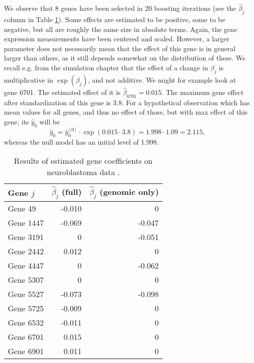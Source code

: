 We observe that 8 genes have been selected in 20 boosting iterations (see the $\hat{\beta}_j$ column in Table \ref{tab:oberthuer-beta}).
Some effects are estimated to be positive, some to be negative, but all are roughly the same size in absolute terms.
Again, the gene expression measurements have been centered and scaled.
However, a larger parameter does not necessarily mean that the effect of this gene is in general larger than others, as it still depends somewhat on the distribution of these.
We recall e.g. from the simulation chapter that the effect of a change in $\beta_j$ is multiplicative in $\exp(\beta_j)$, and not additive.
We might for example look at gene 6701.
The estimated effect of it is $\hat{\beta}_{6701}=0.015$.
The maximum gene effect after standardization of this gene is 3.8.
For a hypothetical observation which has mean values for all genes, and thus no effect of those, but with max effect of this gene, its $\hat{y}_{0}$ will be
\begin{equation*}
    \hat{y}_{0}=\hat{y}_0^{[0]}\cdot\exp(0.015\cdot3.8)=1.998\cdot1.09=2.115,
\end{equation*}
whereas the null model has an initial level of 1.998.

\begin{table}
\caption{Results of estimated gene coefficients on neuroblastoma data \citep{oberthuer-data}.}
\label{tab:oberthuer-beta}
\centering
\begin{tabular}{lrr}
\toprule
Gene $j$      & $\hat{\beta}_j$ (full) & $\hat{\beta}_j$ (genomic only)\\
\hline
Gene 49   & -0.010  &      0  \\
Gene 1447 & -0.069  & -0.047  \\
Gene 3191 &      0  & -0.051  \\
Gene 2442 &  0.012  &      0  \\
Gene 4447 &      0  & -0.062  \\
Gene 5307 &      0  &      0  \\
Gene 5527 & -0.073  & -0.098  \\
Gene 5725 & -0.009  &      0  \\
Gene 6532 & -0.011  &      0  \\
Gene 6701 &  0.015  &      0  \\
Gene 6901 &  0.011  &      0  \\
\bottomrule
\end{tabular}
\end{table}

